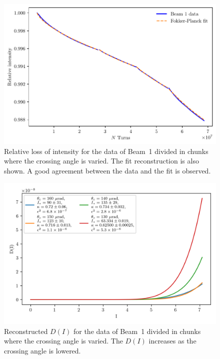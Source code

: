 \begin{figure}[hpt]
    \centering
    \includegraphics[width=1.0\textwidth]{5_wire_compensators_LHC/figs/losses_b1.pdf}
    \caption{Relative loss of intensity for the data of Beam~1 divided in chunks where the crossing angle is varied. The fit reconstruction is also shown. A good agreement between the data and the fit is observed.}
    \label{fig:reconstruction_1}
\end{figure}

\begin{figure}[hpt]
    \centering
    \includegraphics[width=1.0\textwidth]{5_wire_compensators_LHC/figs/fokker_planck_b1_D.png}
    \caption{Reconstructed $D(I)$ for the data of Beam~1 divided in chunks where the crossing angle is varied. The $D(I)$ increases as the crossing angle is lowered.}
    \label{fig:reconstruction_2}
\end{figure}


